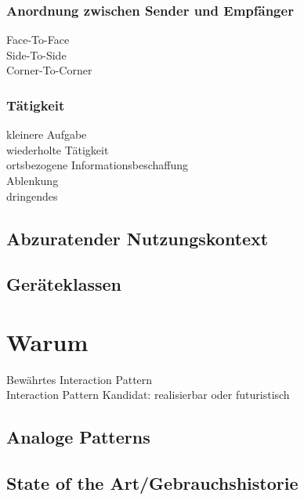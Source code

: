 \subsubsection*{Anordnung zwischen Sender und Empfänger}
\checkbox{\facetoface} Face-To-Face \\
\checkbox{\sidetoside} Side-To-Side \\
\checkbox{\cornertocorner} Corner-To-Corner

\subsubsection*{Tätigkeit}
\checkbox{\smalltask} kleinere Aufgabe \\
\checkbox{\repeatedtask} wiederholte Tätigkeit \\
\checkbox{\locationbased} ortsbezogene Informationsbeschaffung \\
\checkbox{\distraction} Ablenkung \\
\checkbox{\urgent} dringendes 

\subsection*{Abzuratender Nutzungskontext}
\notvalidcontext

\subsection*{Geräteklassen}
\devicetabular


\section*{Warum}

\checkbox{\established} Bewährtes Interaction Pattern \\
\checkbox{\candidate} Interaction Pattern Kandidat: 
\checkbox{\realizable} realisierbar oder
\checkbox{\futuristic} futuristisch 

\subsection*{Analoge Patterns}
\otherpatterns

\subsection*{State of the Art/Gebrauchshistorie}
\stateoftheart

